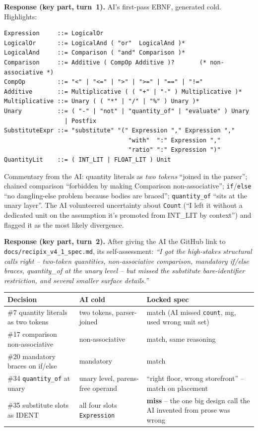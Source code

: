\documentclass[11pt,a4paper]{article}
\newcommand{\field}[1]{\noindent\textbf{#1}}
\begin{document}
\field{Response (key part, turn~1).} AI's first-pass EBNF, generated
cold. Highlights:

\begin{lstlisting}
Expression     ::= LogicalOr
LogicalOr      ::= LogicalAnd ( "or"  LogicalAnd )*
LogicalAnd     ::= Comparison ( "and" Comparison )*
Comparison     ::= Additive ( CompOp Additive )?       (* non-associative *)
CompOp         ::= "<" | "<=" | ">" | ">=" | "==" | "!="
Additive       ::= Multiplicative ( ( "+" | "-" ) Multiplicative )*
Multiplicative ::= Unary ( ( "*" | "/" | "%" ) Unary )*
Unary          ::= ( "-" | "not" | "quantity_of" | "evaluate" ) Unary
                 | Postfix
SubstituteExpr ::= "substitute" "(" Expression "," Expression ","
                                   "with"  ":" Expression ","
                                   "ratio" ":" Expression ")"
QuantityLit    ::= ( INT_LIT | FLOAT_LIT ) Unit
\end{lstlisting}

\noindent Commentary from the AI: quantity literals as \emph{two tokens}
``joined in the parser''; chained comparison ``forbidden by making
Comparison non-associative''; \texttt{if}/\texttt{else} ``no
dangling-else problem because bodies are braced''; \texttt{quantity\_of}
``sits at the unary layer''. The AI volunteered uncertainty about
\texttt{Count} (``I left it without a dedicated unit on the assumption
it's promoted from INT\_LIT by context'') and flagged it as the most
likely divergence.

\field{Response (key part, turn~2).} After giving the AI the GitHub
link to \texttt{docs/recipix\_v4\_1\_spec.md}, its self-assessment:
\emph{``I got the high-stakes structural calls right -- two-token
quantities, non-associative comparison, mandatory if/else braces,
quantity\_of at the unary level -- but missed the substitute
bare-identifier restriction, and several smaller surface details.''}

\begin{center}
\small
\begin{tabular}{@{}p{}p{}p{}@{}}
\toprule
\textbf{Decision} & \textbf{AI cold} & \textbf{Locked spec} \\
\midrule
\#7 quantity literals as two tokens & two tokens, parser-joined & match (AI missed \texttt{count}, mg, used wrong unit set) \\
\#17 comparison non-associative & non-associative & match, same reasoning \\
\#20 mandatory braces on if/else & mandatory & match \\
\#34 \texttt{quantity\_of} at unary & unary level, parens-free operand & ``right floor, wrong storefront'' -- match on placement \\
\#35 substitute slots as IDENT & all four slots \texttt{Expression} & \textbf{miss} -- the one big design call the AI invented from prose was wrong \\
\bottomrule
\end{tabular}
\end{center}
\end{document}
